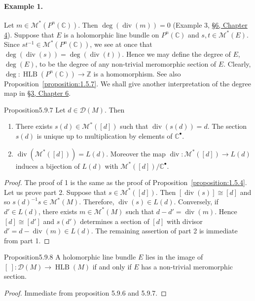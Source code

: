 \paragraph{Example 1.} Let $m\in\mathcal M^*(P^n(\mathbb C))$. Then $\deg(\operatorname{div}(m))=0$ (Example 3, \hyperref[sec:4:6]{\S6, Chapter 4}). Suppose that $E$ is a holomorphic line bundle on $P^n(\mathbb C)$ and $s,t\in\mathcal M^*(E)$. Since $st^{-1}\in\mathcal M^*(P^n(\mathbb C))$, we see at once that $\deg(\operatorname{div}(s))=\deg(\operatorname{div}(t))$. Hence we may define the degree of $E$, $\deg(E)$, to be the degree of any non-trivial meromorphic section of $E$. Clearly, $\deg:\operatorname{HLB}(P^n(\mathbb C))\to\mathbb Z$ is a homomorphism. See also Proposition~\ref{proposition:1.5.7}. We shall give another interpretation of the degree map in \hyperref[sec:6:3]{\S3, Chapter 6}.
\begin{originaltheorem}{Proposition}{5.9.7}
Let $d\in\mathcal D(M)$. Then
\begin{enumerate}
\item There exists $s(d)\in\mathcal M^*([d])$ such that $\operatorname{div}(s(d))=d$. The section $s(d)$ is unique up to multiplication by elements of $\mathbb C^\bullet$.
\item $\operatorname{div}(\mathcal M^*([d]))=L(d)$. Moreover the map $\operatorname{div}:\mathcal M^*([d])\to L(d)$ induces a bijection of $L(d)$ with $\mathcal M^*([d])/\mathbb C^\bullet$.
\end{enumerate}
\end{originaltheorem}
\begin{proof}
The proof of 1 is the same as the proof of Proposition~\ref{proposition:1.5.4}. Let us prove part 2. Suppose that $s\in\mathcal M^*([d])$. Then $[\operatorname{div}(s)]\cong[d]$ and so $s(d)^{-1}s\in\mathcal M^*(M)$. Therefore, $\operatorname{div}(s)\in L(d)$. Conversely, if $d'\in L(d)$, there exists $m\in\mathcal M^*(M)$ such that $d-d'=\operatorname{div}(m)$. Hence $[d]\cong[d']$ and $s(d')$ determines a section of $[d]$ with divisor $d'=d-\operatorname{div}(m)\in L(d)$. The remaining assertion of part 2 is immediate from part 1.
\end{proof}
\begin{originaltheorem}{Proposition}{5.9.8}
A holomorphic line bundle $E$ lies in the image of $[\ ]:\mathcal D(M)\to\operatorname{HLB}(M)$ if and only if $E$ has a non-trivial meromorphic section.
\end{originaltheorem}
\begin{proof} Immediate from proposition 5.9.6 and 5.9.7. \end{proof}
